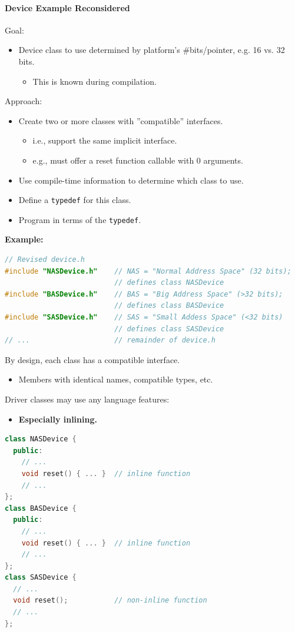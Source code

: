 \paragraph{Device Example Reconsidered}
Goal:
\begin{itemize}
  \item Device class to use determined by platform's \#bits/pointer, e.g. 16 vs. 32 bits.
  \begin{itemize}
    \item This is known during compilation.
  \end{itemize}
\end{itemize}
Approach:
\begin{itemize}
  \item Create two or more classes with ''compatible'' interfaces.
  \begin{itemize}
    \item i.e., support the same implicit interface.
    \item e.g., must offer a reset function callable with 0 arguments.
  \end{itemize}
  \item Use compile-time information to determine which class to use.
  \item Define a \lstinline{typedef} for this class.
  \item Program in terms of the \lstinline{typedef}.
\end{itemize}
\textbf{Example:}
\begin{lstlisting}[language=C++]
// Revised device.h
#include "NASDevice.h"    // NAS = "Normal Address Space" (32 bits);
                          // defines class NASDevice
#include "BASDevice.h"    // BAS = "Big Address Space" (>32 bits);
                          // defines class BASDevice
#include "SASDevice.h"    // SAS = "Small Addess Space" (<32 bits)
                          // defines class SASDevice
// ...                    // remainder of device.h
\end{lstlisting}
By design, each class has a compatible interface.
\begin{itemize}
  \item Members with identical names, compatible types, etc.
\end{itemize}

Driver classes may use any language features:
\begin{itemize}
  \item \textbf{Especially inlining.}
\end{itemize}
\begin{lstlisting}[language=C++]
class NASDevice {
  public:
    // ...
    void reset() { ... }  // inline function
    // ...
};
class BASDevice {
  public:
    // ...
    void reset() { ... }  // inline function
    // ...
};
class SASDevice {
  // ...
  void reset();           // non-inline function
  // ...
};
\end{lstlisting}

